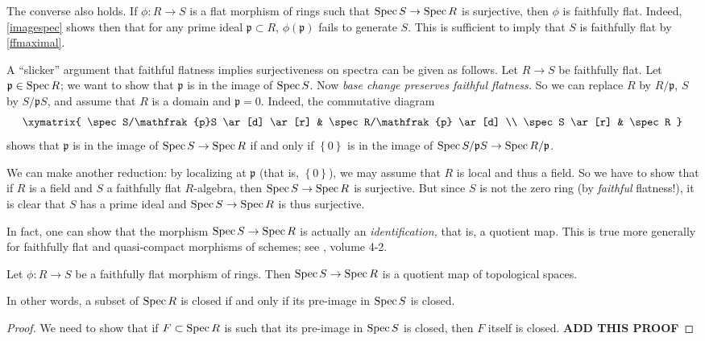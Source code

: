 \begin{remark} 
The converse also holds. If $\phi: R \to S$ is a flat morphism of rings such
that $\operatorname{Spec} S \to \operatorname{Spec} R$ is surjective, then $\phi$ is faithfully flat.
Indeed, \cref{imagespec} shows then that for any prime ideal $\mathfrak{p}
\subset R$, $\phi(\mathfrak{p})$ fails to generate $S$. 
This is sufficient to imply that $S$ is faithfully flat by \cref{ffmaximal}.
\end{remark} 

\begin{remark} 
A ``slicker'' argument that faithful flatness implies surjectiveness on spectra
can be given as follows. Let $R \to S$ be faithfully flat. Let $\mathfrak{p}
\in \operatorname{Spec} R$; we want to show that $\mathfrak{p}$ is in the image of $\operatorname{Spec} S$.
Now \emph{base change preserves faithful flatness.} So we can replace $R$ by
$R/\mathfrak{p}$, $S$ by $S/\mathfrak{p}S$, and assume that $R$ is a domain and
$\mathfrak{p}  = 0$.
Indeed, the commutative diagram
\[ \xymatrix{
\spec S/\mathfrak{p}S \ar[d] \ar[r] &  \spec R/\mathfrak{p} \ar[d]  \\
\spec S \ar[r] &  \spec R
}\]
shows that $\mathfrak{p}$ is in the image of $\operatorname{Spec} S \to \operatorname{Spec} R$ if and only
if $\left\{0\right\}$ is in the image of $\operatorname{Spec} S/\mathfrak{p}S \to \operatorname{Spec}
R/\mathfrak{p}$.

We can make another reduction: by localizing at $\mathfrak{p}$ (that is,
$\left\{0\right\}$), we may assume that $R$ is local and thus a field.
So we have to show that if $R$ is a field and $S$ a faithfully flat
$R$-algebra, then $\operatorname{Spec} S \to \operatorname{Spec} R$ is surjective. But since $S$ is not the
zero ring (by \emph{faithful} flatness!), it is clear that $S$ has a prime
ideal and $\operatorname{Spec} S \to \operatorname{Spec} R$ is thus surjective.
\end{remark} 

In fact, one can show that the morphism $\operatorname{Spec} S \to \operatorname{Spec} R$ is actually an
\emph{identification,} that is, a quotient map. This is true more generally
for faithfully flat and quasi-compact morphisms of schemes; see \cite{EGA},
volume 4-2.

\begin{theorem} 
Let $\phi: R \to S$ be a faithfully flat morphism of rings. Then $\operatorname{Spec} S \to
\operatorname{Spec} R$ is a quotient map of topological spaces.
\end{theorem} 

In other words, a subset of $\operatorname{Spec} R$ is closed if and only if its pre-image
in $\operatorname{Spec} S$ is closed.

\begin{proof} 
We need to show that if $F \subset \operatorname{Spec} R$ is such that its pre-image in
$\operatorname{Spec} S$ is closed, then $F$ itself is closed.  \textbf{ADD THIS PROOF}
\end{proof} 


